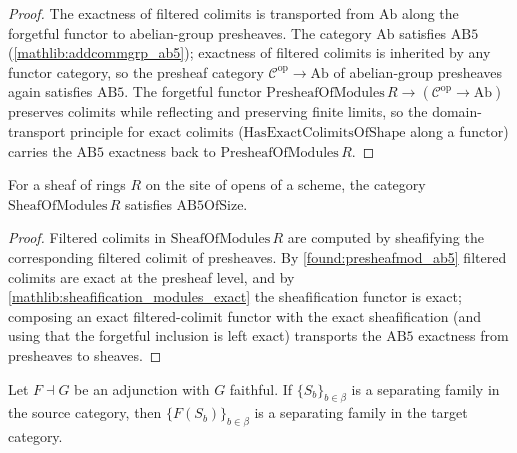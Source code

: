 \begin{proof}
  \leanok
  The exactness of filtered colimits is transported from \(\mathrm{Ab}\) along the
  forgetful functor to abelian-group presheaves.  The category \(\mathrm{Ab}\)
  satisfies \(\mathrm{AB5}\) (\cref{mathlib:addcommgrp_ab5}); exactness of filtered
  colimits is inherited by any functor category, so the presheaf category
  \(\mathcal C^{\mathrm{op}}\to\mathrm{Ab}\) of abelian-group presheaves again
  satisfies \(\mathrm{AB5}\).  The forgetful functor
  \(\mathrm{PresheafOfModules}\,R\to(\mathcal C^{\mathrm{op}}\to\mathrm{Ab})\)
  preserves colimits while reflecting and preserving finite limits, so the
  domain-transport principle for exact colimits (\(\mathrm{HasExactColimitsOfShape}
  \) along a functor) carries the \(\mathrm{AB5}\) exactness back to
  \(\mathrm{PresheafOfModules}\,R\).
\end{proof}

\begin{lemma}
  \label{found:sheafmod_ab5}
  For a sheaf of rings \(R\) on the site of opens of a scheme, the category
  \(\mathrm{SheafOfModules}\,R\) satisfies \(\mathrm{AB5OfSize}\).
\end{lemma}

\begin{proof}
  \leanok
  Filtered colimits in \(\mathrm{SheafOfModules}\,R\) are computed by sheafifying
  the corresponding filtered colimit of presheaves.  By
  \cref{found:presheafmod_ab5} filtered colimits are exact at the presheaf level,
  and by \cref{mathlib:sheafification_modules_exact} the sheafification functor is
  exact; composing an exact filtered-colimit functor with the exact
  sheafification (and using that the forgetful inclusion is left exact) transports
  the \(\mathrm{AB5}\) exactness from presheaves to sheaves.
\end{proof}

\begin{lemma}
  \label{found:separating_transport_left_adjoint}
  Let \(F\dashv G\) be an adjunction with \(G\) faithful.  If \(\{S_b\}_{b\in\beta}\)
  is a separating family in the source category, then \(\{F(S_b)\}_{b\in\beta}\)
  is a separating family in the target category.
\end{lemma}


